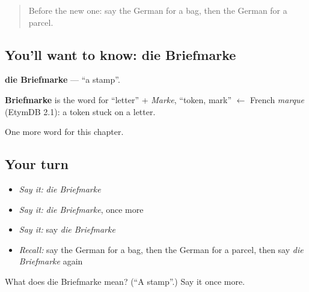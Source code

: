 \begin{quote}
Before the new one: say the German for a bag, then the German for a parcel.
\end{quote}

\subsection*{You'll want to know: die Briefmarke}
\textbf{die Briefmarke} — \textquotedblleft{}a stamp\textquotedblright{}.

\begin{cousinweb}
\textbf{Briefmarke} is the word for \textquotedblleft{}letter\textquotedblright{} + \emph{Marke}, \textquotedblleft{}token, mark\textquotedblright{} $\leftarrow$ French \emph{marque} (EtymDB 2.1): a token stuck on a letter.
\end{cousinweb}

\begin{grammarlens}[title={What you've built}]
One more word for this chapter.
\end{grammarlens}

\subsection*{Your turn}
\begin{itemize}
\raggedright
  \item \emph{Say it:} \emph{die Briefmarke}
  \item \emph{Say it:} \emph{die Briefmarke}, once more
  \item \emph{Say it:} say \emph{die Briefmarke}
  \item \emph{Recall:} say the German for a bag, then the German for a parcel, then say \emph{die Briefmarke} again
\end{itemize}

\begin{tcolorbox}[breakable,colback=teal!4,colframe=teal!35!black,title={Before you move on}]
What does die Briefmarke mean? (\textquotedblleft{}A stamp\textquotedblright{}.) Say it once more.
\end{tcolorbox}

